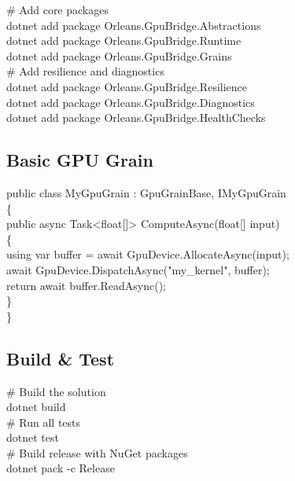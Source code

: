 \documentclass[11pt,a4paper]{article}
\begin{document}
\begin{tcolorbox}[colback=brand!3, colframe=brand!40, boxrule=0.5pt, arc=3pt,
                   left=8pt, right=8pt, top=6pt, bottom=6pt]
\ttfamily\small
\# Add core packages\\
dotnet add package Orleans.GpuBridge.Abstractions\\
dotnet add package Orleans.GpuBridge.Runtime\\
dotnet add package Orleans.GpuBridge.Grains\\[6pt]
\# Add resilience and diagnostics\\
dotnet add package Orleans.GpuBridge.Resilience\\
dotnet add package Orleans.GpuBridge.Diagnostics\\
dotnet add package Orleans.GpuBridge.HealthChecks
\end{tcolorbox}

\subsection{Basic GPU Grain}

\begin{tcolorbox}[colback=brand!3, colframe=brand!40, boxrule=0.5pt, arc=3pt,
                   left=8pt, right=8pt, top=6pt, bottom=6pt]
\ttfamily\small
public class MyGpuGrain : GpuGrainBase, IMyGpuGrain\\
\{\\
\hspace*{1em}public async Task<float[]> ComputeAsync(float[] input)\\
\hspace*{1em}\{\\
\hspace*{2em}using var buffer = await GpuDevice.AllocateAsync(input);\\
\hspace*{2em}await GpuDevice.DispatchAsync("my\_kernel", buffer);\\
\hspace*{2em}return await buffer.ReadAsync();\\
\hspace*{1em}\}\\
\}
\end{tcolorbox}

\subsection{Build \& Test}

\begin{tcolorbox}[colback=brand!3, colframe=brand!40, boxrule=0.5pt, arc=3pt,
                   left=8pt, right=8pt, top=6pt, bottom=6pt]
\ttfamily\small
\# Build the solution\\
dotnet build\\[6pt]
\# Run all tests\\
dotnet test\\[6pt]
\# Build release with NuGet packages\\
dotnet pack -c Release
\end{tcolorbox}
\end{document}

